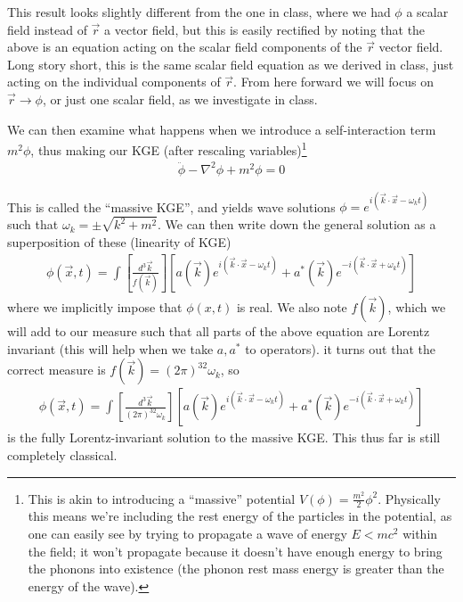\documentclass[12pt]{article}
\begin{document}
This result looks slightly different from the one in class, where we had $\phi$ a scalar field instead of $\vec{r}$ a vector field, but this is easily rectified by noting that the above is an equation acting on the scalar field components of the $\vec{r}$ vector field. Long story short, this is the same scalar field equation as we derived in class, just acting on the individual components of $\vec{r}$. From here forward we will focus on $\vec{r} \to \phi$, or just one scalar field, as we investigate in class.

We can then examine what happens when we introduce a self-interaction term $m^2\phi$, thus making our KGE (after rescaling variables)\footnote{This is akin to introducing a ``massive'' potential $V(\phi) = \frac{m^2}{2}\phi^2$. Physically this means we're including the rest energy of the particles in the potential, as one can easily see by trying to propagate a wave of energy $E < mc^2$ within the field; it won't propagate because it doesn't have enough energy to bring the phonons into existence (the phonon rest mass energy is greater than the energy of the wave).}
\begin{align}
    \ddot{\phi} - \nabla^2 \phi + m^2\phi = 0
\end{align}

This is called the ``massive KGE'', and yields wave solutions $\phi = e^{i\left( \vec{k} \cdot \vec{x} - \omega_k t \right)}$ such that $\omega_k = \pm \sqrt{k^2 + m^2}$. We can then write down the general solution as a superposition of these (linearity of KGE)
\begin{align}
    \phi(\vec{x},t) = \int \left[ \frac{d^3\vec{k}}{f(\vec{k})} \right]\left[ a(\vec{k}) e^{i\left( \vec{k} \cdot \vec{x} - \omega_kt \right)} + a^*(\vec{k}) e^{-i\left( \vec{k} \cdot \vec{x} + \omega_kt \right)} \right]
\end{align}
where we implicitly impose that $\phi(x,t)$ is real. We also note $f(\vec{k})$, which we will add to our measure such that all parts of the above equation are Lorentz invariant (this will help when we take $a, a^*$ to operators). it turns out that the correct measure is $f(\vec{k}) = (2\pi)^32\omega_k$, so
\begin{align}
    \phi(\vec{x},t) = \int \left[ \frac{d^3\vec{k}}{(2\pi)^32\omega_k} \right]\left[ a(\vec{k}) e^{i\left( \vec{k} \cdot \vec{x} - \omega_kt \right)} + a^*(\vec{k}) e^{-i\left( \vec{k} \cdot \vec{x} + \omega_kt \right)} \right]\label{KGEsol}
\end{align}
is the fully Lorentz-invariant solution to the massive KGE. This thus far is still completely classical.
\end{document}
